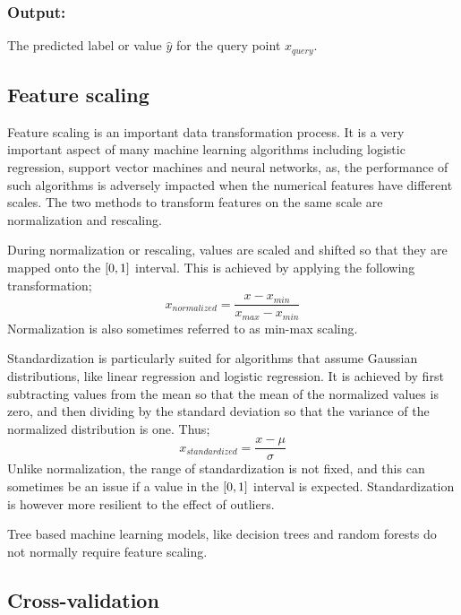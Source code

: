 		\subsubsection{Output:}
		The predicted label or value $\hat{y}$ for the query point $x_{query}$.
		



	\subsection{Feature scaling}

		Feature scaling is an important data transformation process. It is a very important aspect of many machine learning algorithms including logistic regression, support vector machines and neural networks, as, the performance of such algorithms is adversely impacted when the numerical features have different scales. The two methods to transform features on the same scale are normalization and rescaling.
		
		During normalization or rescaling, values are scaled and shifted so that they are mapped onto the $[0,\space 1]$ interval. This is achieved by applying the following transformation;
		$$
		x_{normalized} = \frac{x - x_{min}}{x_{max}-x_{min}}
		$$
		Normalization is also sometimes referred to as min-max scaling.
		
		Standardization is particularly suited for algorithms that assume Gaussian distributions, like linear regression and logistic regression. It is achieved by first subtracting values from the mean so that the mean of the normalized values is zero, and then dividing by the standard deviation so that the variance of the normalized distribution is one. Thus;
		$$
		x_{standardized} = \frac{x - \mu}{\sigma}
		$$
		Unlike normalization, the range of standardization is not fixed, and this can sometimes be an issue if a value in the $[0,\space 1]$ interval is expected.  Standardization is however more resilient to the effect of outliers.
		
		Tree based machine learning models, like decision trees and random forests do not normally require feature scaling.


	
	\subsection{Cross-validation}
	
